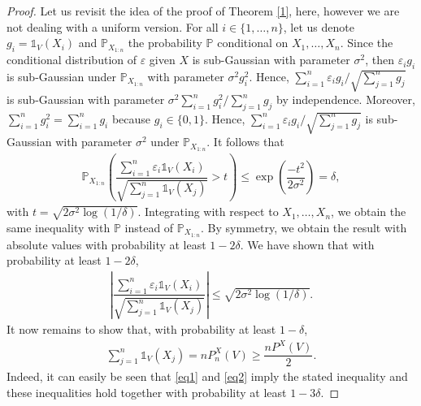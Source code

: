 \documentclass[paper=a4, fontsize=11pt]{scrartcl}
\newcommand{\pr}{\mathbb{P}}
\newcommand{\ind}{\mathds{1}}
\newcommand{\PP}{\mathbb{P}}
\begin{document}
\begin{proof}
Let us revisit the idea of the proof of Theorem \ref{1}, here, however we are not dealing with a uniform version. For all $i \in \{1, \dots, n\}$, let us denote $g_i = \ind_V(X_i)$ and \( \mathbb{P}_{X_{1:n}} \) the probability \( \mathbb{P} \) conditional on \( {X}_1, \dots, {X_n} \). Since the conditional distribution of $\varepsilon$ given $X$ is sub-Gaussian with parameter $\sigma^2$, then  $\varepsilon_i g_i$ is sub-Gaussian under $\mathbb{P}_{X_{1:n}}$ with parameter $\sigma^2 g_i^2$. Hence, ${\sum_{i=1}^n \varepsilon_i g_i}/\sqrt{{ \sum_{j=1}^n g_j}}$ is sub-Gaussian with parameter $\sigma^2 \sum_{i=1}^n g_i^2 / \sum_{j=1}^n g_j$ by independence. Moreover, $\sum_{i=1}^n g_i^2 = \sum_{i=1}^n g_i$ because $g_i\in \{ 0,1\} $. Hence, ${\sum_{i=1}^n \varepsilon_i g_i}/\sqrt{{ \sum_{j=1}^n g_j}}$ is sub-Gaussian with parameter $\sigma^2$ under $\mathbb{P}_{X_{1:n}}$. It follows that
\begin{align*}
    \mathbb{P}_{X_{1:n}}\left(\dfrac{\sum_{i=1}^n \varepsilon_i \ind_{ V }(X_i)}{\sqrt{\sum_{j=1}^n \ind_{ V }(X_j)}} > t  \right)  \leq \exp\left( \dfrac{-t^2}{2\sigma^2}\right) = \delta,
\end{align*}
   with  $t = \sqrt{2\sigma^2 \log(1/\delta)}$.
 Integrating with respect to $X_1,\dots, X_n$, we obtain the same inequality with $\mathbb P $ instead of $\mathbb{P}_{X_{1:n}}$. By symmetry, we obtain the result with absolute values with probability at least \( 1 - 2\delta \). 
 We have shown that with probability at least $1-2\delta$,
\begin{align}\label{eq1}
    \left| \dfrac{ \sum_{i=1}^n \varepsilon_i \ind_{V}(X_i) } {\sqrt{\sum_{j=1}^n \ind_{ V }(X_j)}}  \right| \leq  \sqrt{2\sigma^2 \log(1/\delta)}.
\end{align}
It now remains to show that, with probability at least $1-\delta$,
\begin{align}\label{eq2}
   \sum_{j=1}^n \ind_{ V }(X_j) = n 
P_n^X(V)  \geq  \dfrac{n P^X(V)}{2}.
\end{align}
Indeed, it can easily be seen that \eqref{eq1} and \eqref{eq2} imply the stated inequality and these inequalities hold together with probability at least $1-3\delta$.





\end{proof}
\end{document}
